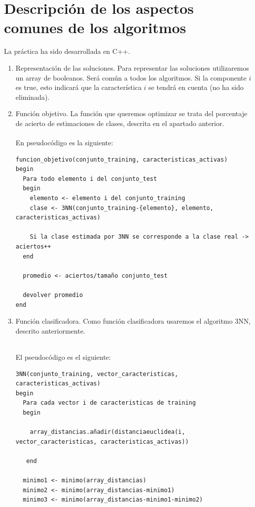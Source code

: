 	\newpage
	
	
	\section{Descripción de los aspectos comunes de los algoritmos}
	La práctica ha sido desarrollada en C++.
	\\
	
	\begin{enumerate}
		\item Representación de las soluciones. Para representar las soluciones utilizaremos un array de booleanos. Será común a todos los algoritmos. Si la componente $i$ es true, esto indicará que la característica $i$ se tendrá en cuenta (no ha sido eliminada).
		
		\item Función objetivo. La función que queremos optimizar se trata del porcentaje de acierto de estimaciones de clases, descrita en el apartado anterior.
		\\
		\\
		En pseudocódigo es la siguiente:
		\begin{lstlisting}
funcion_objetivo(conjunto_training, caracteristicas_activas)
begin
  Para todo elemento i del conjunto_test
  begin
    elemento <- elemento i del conjunto_training
	clase <- 3NN(conjunto_training-{elemento}, elemento, caracteristicas_activas)
				
	Si la clase estimada por 3NN se corresponde a la clase real -> aciertos++
  end
			
  promedio <- aciertos/tamaño conjunto_test
			
  devolver promedio
end
		\end{lstlisting}
		
		\item Función clasificadora. Como función clasificadora usaremos el algoritmo 3NN, descrito anteriormente.
		\\
		\\
		\newpage
		
		El pseudocódigo es el siguiente:
		\begin{lstlisting}
3NN(conjunto_training, vector_caracteristicas, caracteristicas_activas)
begin
  Para cada vector i de caracteristicas de training
  begin
  
    array_distancias.añadir(distanciaeuclidea(i, vector_caracteristicas, caracteristicas_activas))
    
   end
   
  minimo1 <- minimo(array_distancias)
  minimo2 <- minimo(array_distancias-minimo1)
  minimo3 <- minimo(array_distancias-minimo1-minimo2)
  

\end{lstlisting}
\end{enumerate}
